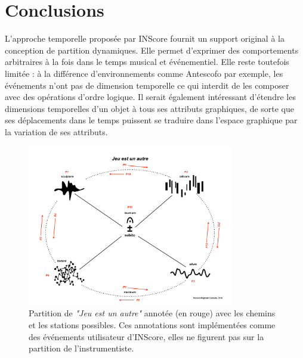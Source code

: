 \documentclass{article}
\begin{document}
\section{Conclusions}
L'approche temporelle proposée par INScore fournit un support original à la conception de partition dynamiques. Elle permet d'exprimer des comportements arbitraires à la fois dans le temps musical et événementiel.  
Elle reste toutefois limitée : à la différence d'environnements comme Antescofo par exemple, les événements n'ont pas de dimension temporelle ce qui interdit de les composer avec des opérations d'ordre logique. Il serait également intéressant d'étendre les dimensions temporelles d'un objet à tous ses attributs graphiques, de sorte que ses déplacements dans le temps puissent se traduire dans l'espace graphique par la variation de ses attributs.

\balance




\begin{figure}[ht]
   \centering
   \includegraphics[width=0.8\textwidth]{imgs/jeu}
   \caption{Partition de \emph{"Jeu est un autre"} annotée (en rouge) avec les chemins et les stations possibles. Ces annotations sont implémentées comme des événements utilisateur d'INScore, elles ne figurent pas sur la partition de l'instrumentiste.}
   \label{fig:sample}
\end{figure}
\end{document}
